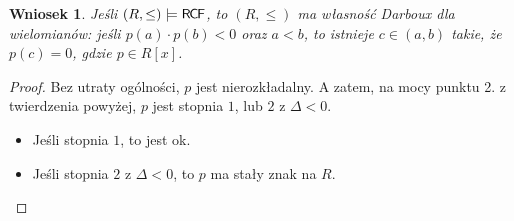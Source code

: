\documentclass{article}
\theoremstyle{plain}
\newtheorem{wn}[thm]{Wniosek}
\theoremstyle{definition}
\theoremstyle{remark}
\newcommand{\RCF}{\mathsf{R \mkern-1.7mu C \mkern-1.4mu F}}
\begin{document}
\begin{wn}
	Jeśli $ (R, \leq) \models \RCF $, to $ (R, \leq) $ ma własność Darboux
	dla wielomianów:
	jeśli $ p(a) \cdot p(b) < 0 $ oraz $ a <b $, to istnieje $c \in (a, b)
	$ takie, że $ p(c) = 0 $, gdzie $ p \in R[x] $.
\end{wn}
\begin{proof}
	 Bez utraty ogólności, $ p $ jest nierozkładalny.
	 A zatem, na mocy punktu 2. z twierdzenia powyżej, $ p $ jest stopnia $
	 1 $, lub $ 2 $ z $ \Delta < 0$.
	 \begin{itemize}
		 \item Jeśli stopnia $ 1 $, to jest ok.
		 \item Jeśli stopnia $2$ z $\Delta < 0 $, to $ p $ ma stały
			 znak na $ R $.
	 \end{itemize}
\end{proof}
\end{document}
